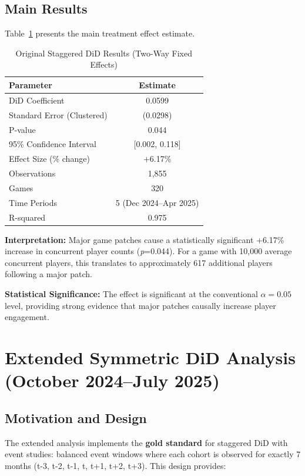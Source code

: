 \documentclass[12pt,a4paper]{article}
\begin{document}
\subsection{Main Results}

Table~\ref{tab:original-results} presents the main treatment effect estimate.

\begin{table}[H]
\centering
\caption{Original Staggered DiD Results (Two-Way Fixed Effects)}
\label{tab:original-results}
\begin{tabular}{lc}
\toprule
\textbf{Parameter} & \textbf{Estimate} \\
\midrule
DiD Coefficient & 0.0599 \\
Standard Error (Clustered) & (0.0298) \\
P-value & 0.044 \\
95\% Confidence Interval & [0.002, 0.118] \\
Effect Size (\% change) & +6.17\% \\
\midrule
Observations & 1,855 \\
Games & 320 \\
Time Periods & 5 (Dec 2024--Apr 2025) \\
R-squared & 0.975 \\
\bottomrule
\end{tabular}
\end{table}

\textbf{Interpretation:} Major game patches cause a statistically significant +6.17\% increase in concurrent player counts (\textit{p}=0.044). For a game with 10,000 average concurrent players, this translates to approximately 617 additional players following a major patch.

\textbf{Statistical Significance:} The effect is significant at the conventional $\alpha=0.05$ level, providing strong evidence that major patches causally increase player engagement.

\clearpage

\section{Extended Symmetric DiD Analysis (October 2024--July 2025)}
\label{sec:extended-symmetric}

\subsection{Motivation and Design}

The extended analysis implements the \textbf{gold standard} for staggered DiD with event studies: balanced event windows where each cohort is observed for exactly 7 months (t-3, t-2, t-1, t, t+1, t+2, t+3). This design provides:
\end{document}
